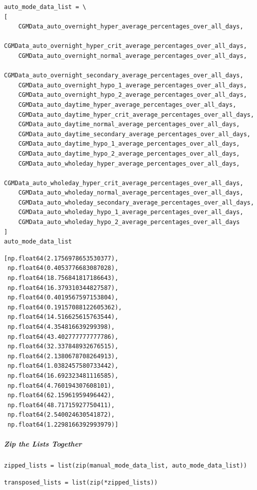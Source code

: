 \begin{verbatim}
auto_mode_data_list = \
[
    CGMData_auto_overnight_hyper_average_percentages_over_all_days,
    CGMData_auto_overnight_hyper_crit_average_percentages_over_all_days,
    CGMData_auto_overnight_normal_average_percentages_over_all_days,
    CGMData_auto_overnight_secondary_average_percentages_over_all_days,
    CGMData_auto_overnight_hypo_1_average_percentages_over_all_days,
    CGMData_auto_overnight_hypo_2_average_percentages_over_all_days,
    CGMData_auto_daytime_hyper_average_percentages_over_all_days,
    CGMData_auto_daytime_hyper_crit_average_percentages_over_all_days,
    CGMData_auto_daytime_normal_average_percentages_over_all_days,
    CGMData_auto_daytime_secondary_average_percentages_over_all_days,
    CGMData_auto_daytime_hypo_1_average_percentages_over_all_days,
    CGMData_auto_daytime_hypo_2_average_percentages_over_all_days,
    CGMData_auto_wholeday_hyper_average_percentages_over_all_days,
    CGMData_auto_wholeday_hyper_crit_average_percentages_over_all_days,
    CGMData_auto_wholeday_normal_average_percentages_over_all_days,
    CGMData_auto_wholeday_secondary_average_percentages_over_all_days,
    CGMData_auto_wholeday_hypo_1_average_percentages_over_all_days,
    CGMData_auto_wholeday_hypo_2_average_percentages_over_all_days
]
auto_mode_data_list
\end{verbatim}

\begin{verbatim}
[np.float64(2.1756978653530377),
 np.float64(0.4053776683087028),
 np.float64(18.756841817186643),
 np.float64(16.379310344827587),
 np.float64(0.4019567597153804),
 np.float64(0.19157088122605362),
 np.float64(14.516625615763544),
 np.float64(4.354816639299398),
 np.float64(43.402777777777786),
 np.float64(32.337848932676515),
 np.float64(2.1380678708264913),
 np.float64(1.0382457580733442),
 np.float64(16.692323481116585),
 np.float64(4.760194307608101),
 np.float64(62.15961959496442),
 np.float64(48.71715927750411),
 np.float64(2.540024630541872),
 np.float64(1.2298166392993979)]
\end{verbatim}

\subparagraph{Zip the Lists Together}

\begin{verbatim}
zipped_lists = list(zip(manual_mode_data_list, auto_mode_data_list))
\end{verbatim}

\begin{verbatim}
transposed_lists = list(zip(*zipped_lists))
\end{verbatim}

